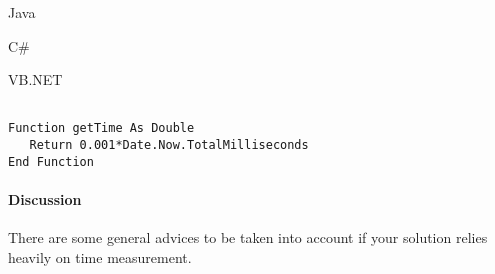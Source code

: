 Java

\begin{Shaded}
\begin{Highlighting}[]

 \NormalTok{() \{}
    \NormalTok{*}\NormalTok{();}
\NormalTok{\}}
\end{Highlighting}
\end{Shaded}

C\#

\begin{Shaded}
\begin{Highlighting}[]

 \NormalTok{() \{}
    \NormalTok{;}
\NormalTok{\}}
\end{Highlighting}
\end{Shaded}

VB.NET

\begin{verbatim}

Function getTime As Double
   Return 0.001*Date.Now.TotalMilliseconds
End Function
\end{verbatim}

\begin{Shaded}
\begin{Highlighting}[]

\end{Highlighting}
\end{Shaded}

\hypertarget{discussion}{%
\paragraph{Discussion}\label{discussion}}

There are some general advices to be taken into account if your solution
relies heavily on time measurement.

